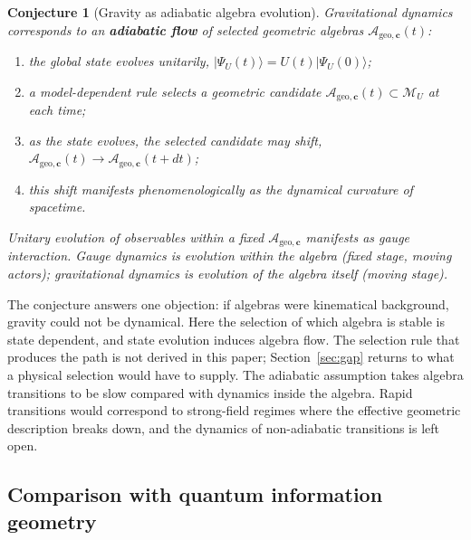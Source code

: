 \documentclass[12pt,a4paper]{article}
\newtheorem{conjecture}[theorem]{Conjecture}
\begin{document}
\begin{conjecture}[Gravity as adiabatic algebra evolution]
\label{conj:main}
Gravitational dynamics corresponds to an \textbf{adiabatic flow} of selected geometric algebras $\mathcal{A}_{\mathrm{geo},\mathbf{c}}(t)$:
\begin{enumerate}
    \item the global state evolves unitarily, $|\Psi_U(t)\rangle = U(t)|\Psi_U(0)\rangle$;
    \item a model-dependent rule selects a geometric candidate $\mathcal{A}_{\mathrm{geo},\mathbf{c}}(t)\subset\mathcal M_U$ at each time;
    \item as the state evolves, the selected candidate may shift, $\mathcal{A}_{\mathrm{geo},\mathbf{c}}(t) \to \mathcal{A}_{\mathrm{geo},\mathbf{c}}(t + dt)$;
    \item this shift manifests phenomenologically as the dynamical curvature of spacetime.
\end{enumerate}
Unitary evolution of observables within a fixed $\mathcal{A}_{\mathrm{geo},\mathbf{c}}$ manifests as gauge interaction. Gauge dynamics is evolution within the algebra (fixed stage, moving actors); gravitational dynamics is evolution of the algebra itself (moving stage).
\end{conjecture}

The conjecture answers one objection: if algebras were kinematical background, gravity could not be dynamical. Here the selection of which algebra is stable is state dependent, and state evolution induces algebra flow. The selection rule that produces the path is not derived in this paper; Section~\ref{sec:gap} returns to what a physical selection would have to supply. The adiabatic assumption takes algebra transitions to be slow compared with dynamics inside the algebra. Rapid transitions would correspond to strong-field regimes where the effective geometric description breaks down, and the dynamics of non-adiabatic transitions is left open.

\subsection{Comparison with quantum information geometry}
\end{document}
